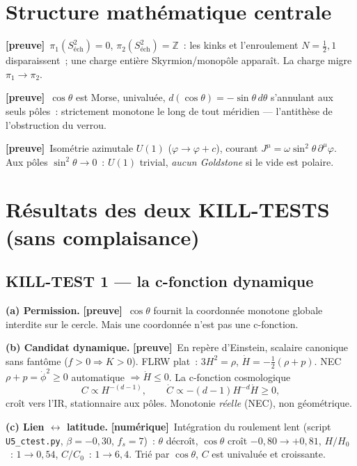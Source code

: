 \documentclass[11pt]{article}
\newcommand{\preuve}{{\small\textbf{[preuve]}}}
\newcommand{\num}{{\small\textbf{[num\'erique]}}}
\newcommand{\Stwo}{S^2_{\text{\'ech}}}
\theoremstyle{definition}
\begin{document}
\section{Structure math\'ematique centrale}
\preuve\ $\pi_1(\Stwo)=0$, $\pi_2(\Stwo)=\mathbb{Z}$~: les kinks et l'enroulement $N=\tfrac12,1$
disparaissent~; une charge enti\`ere Skyrmion/monop\^ole appara\^it. La charge migre $\pi_1\to\pi_2$.

\preuve\ $\cos\theta$ est Morse, univalu\'ee, $d(\cos\theta)=-\sin\theta\,d\theta$ s'annulant aux seuls
p\^oles~: strictement monotone le long de tout m\'eridien --- l'antith\`ese de l'obstruction du verrou.

\preuve\ Isom\'etrie azimutale $U(1)$ ($\varphi\to\varphi+c$), courant
$J^\mu=\omega\sin^2\!\theta\,\partial^\mu\varphi$. Aux p\^oles $\sin^2\!\theta\to0$~: $U(1)$ trivial,
\emph{aucun Goldstone} si le vide est polaire.

\section{R\'esultats des deux KILL-TESTS (sans complaisance)}

\subsection{KILL-TEST 1 --- la c-fonction dynamique}
\textbf{(a) Permission.} \preuve\ $\cos\theta$ fournit la coordonn\'ee monotone globale interdite sur le
cercle. Mais une coordonn\'ee n'est pas une c-fonction.

\textbf{(b) Candidat dynamique.} \preuve\ En rep\`ere d'Einstein, scalaire canonique sans fant\^ome
($f>0\Rightarrow K>0$). FLRW plat~: $3H^2=\rho$, $\dot H=-\tfrac12(\rho+p)$. NEC $\rho+p=\dot\phi^2\ge0$
automatique $\Rightarrow\dot H\le0$. La c-fonction cosmologique~\cite{FGPW1999}
\begin{equation}\label{eq:Cdef}
C\propto H^{-(d-1)},\qquad \dot C\propto-(d-1)H^{-d}\dot H\ge0,
\end{equation}
cro\^it vers l'IR, stationnaire aux p\^oles. Monotonie \emph{r\'eelle} (NEC), non g\'eom\'etrique.

\textbf{(c) Lien $\leftrightarrow$ latitude.} \num\ Int\'egration du roulement lent (script
\texttt{U5\_ctest.py}, $\beta=-0{,}30$, $f_s=7$)~: $\theta$ d\'ecro\^it, $\cos\theta$ cro\^it
$-0{,}80\to+0{,}81$, $H/H_0$~: $1\to0{,}54$, $C/C_0$~: $1\to6{,}4$. Tri\'e par $\cos\theta$, $C$ est
univalu\'ee et croissante.
\end{document}

